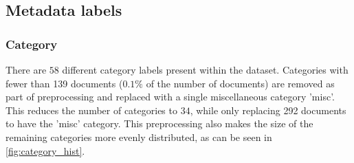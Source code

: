 \subsection{Metadata labels}\label{sec:appendix_meta_data}

\subsubsection{Category}\label{subsec:appendix_category}

There are $58$ different category labels present within the dataset.
Categories with fewer than 139 documents ($0.1\%$ of the number of documents) are removed as part of preprocessing and replaced with a single miscellaneous category 'misc'.
This reduces the number of categories to $34$, while only replacing 292 documents to have the 'misc' category.
This preprocessing also makes the size of the remaining categories more evenly distributed, as can be seen in \autoref{fig:category_hist}.

